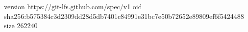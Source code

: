 version https://git-lfs.github.com/spec/v1
oid sha256:b575384c3d2309dd28d5db7401c84991e31bc7e50b72652e89809ef6f5424488
size 262240
